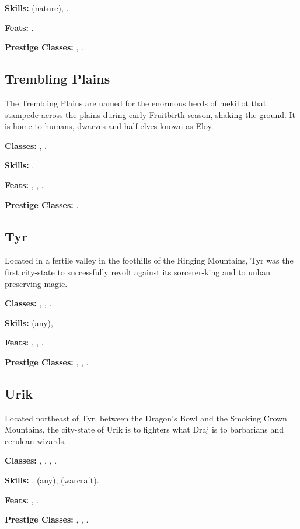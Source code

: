 \textbf{Skills:}  (nature), .

\textbf{Feats:} .

\textbf{Prestige Classes:} , .


\subsection{Trembling Plains}
The Trembling Plains are named for the enormous herds of mekillot that stampede across the plains during early Fruitbirth season, shaking the ground. It is home to humans, dwarves and half-elves known as Eloy.

\textbf{Classes:} , .

\textbf{Skills:} .

\textbf{Feats:} , , .

\textbf{Prestige Classes:} .


\subsection{Tyr}
Located in a fertile valley in the foothills of the Ringing Mountains, Tyr was the first city-state to successfully revolt against its sorcerer-king and to unban preserving magic.

\textbf{Classes:} , , .

\textbf{Skills:}  (any), .

\textbf{Feats:} , , .

\textbf{Prestige Classes:} , , .

\subsection{Urik}
Located northeast of Tyr, between the Dragon's Bowl and the Smoking Crown Mountains, the city-state of Urik is to fighters what Draj is to barbarians and cerulean wizards.

\textbf{Classes:} , , , .

\textbf{Skills:} ,  (any),  (warcraft).

\textbf{Feats:} , .

\textbf{Prestige Classes:} , , .
